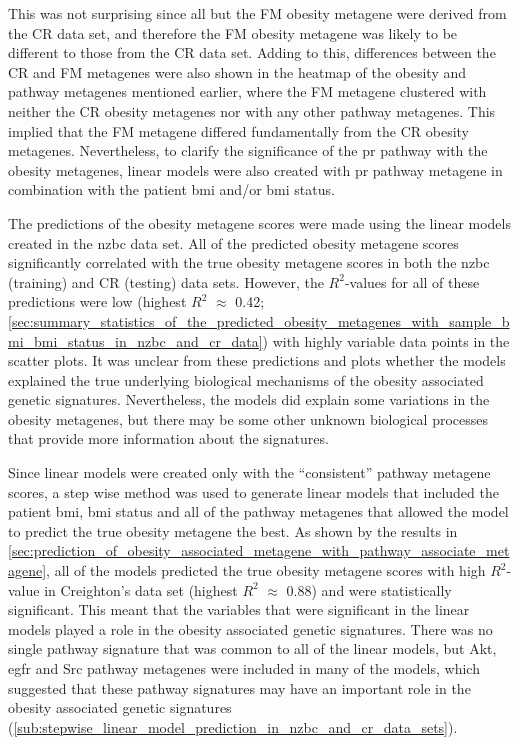 This was not surprising since all but the FM obesity metagene were derived from the CR data set, and therefore the FM obesity metagene was likely to be different to those from the CR data set.
Adding to this, differences between the CR and FM metagenes were also shown in the heatmap of the obesity and pathway metagenes mentioned earlier, where the FM metagene clustered with neither the CR obesity metagenes nor with any other pathway metagenes.
This implied that the FM metagene differed fundamentally from the CR obesity metagenes.
Nevertheless, to clarify the significance of the \gls{pr} pathway with the obesity metagenes, linear models were also created with \gls{pr} pathway metagene in combination with the patient \gls{bmi} and/or \gls{bmi} status.

The predictions of the obesity metagene scores were made using the linear models created in the \gls{nzbc} data set.
All of the predicted obesity metagene scores significantly correlated with the true obesity metagene scores in both the \gls{nzbc} (training) and CR (testing) data sets.
However, the $R^2$-values for all of these predictions were low (highest $R^2$ $\approx$ 0.42; \cref{sec:summary_statistics_of_the_predicted_obesity_metagenes_with_sample_bmi_bmi_status_in_nzbc_and_cr_data}) with highly variable data points in the scatter plots.
It was unclear from these predictions and plots whether the models explained the true underlying biological mechanisms of the obesity associated genetic signatures.
Nevertheless, the models did explain some variations in the obesity metagenes, but there may be some other unknown biological processes that provide more information about the signatures.

Since linear models were created only with the ``consistent'' pathway metagene scores, a step wise method was used to generate linear models that included the patient \gls{bmi}, \gls{bmi} status and all of the pathway metagenes that allowed the model to predict the true obesity metagene the best.
As shown by the results in \cref{sec:prediction_of_obesity_associated_metagene_with_pathway_associate_metagene}, all of the models predicted the true obesity metagene scores with high $R^2$-value in Creighton's data set (highest $R^2$ $\approx$ 0.88) and were statistically significant.
This meant that the variables that were significant in the linear models played a role in the obesity associated genetic signatures.
There was no single pathway signature that was common to all of the linear models, but Akt, \gls{egfr} and Src pathway metagenes were included in many of the models, which suggested that these pathway signatures may have an important role in the obesity associated genetic signatures (\cref{sub:stepwise_linear_model_prediction_in_nzbc_and_cr_data_sets}).

